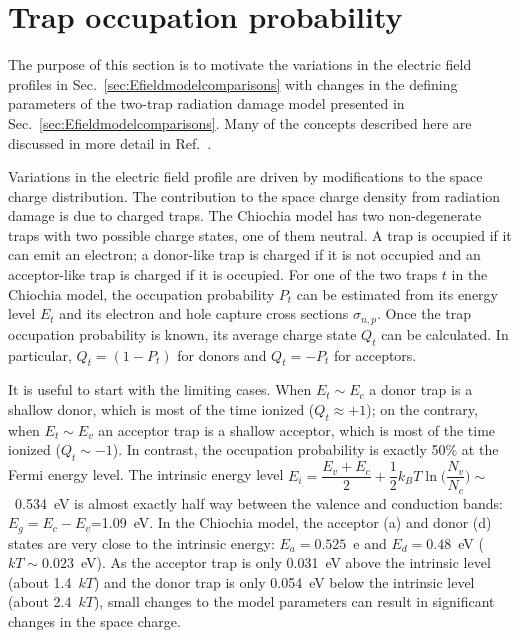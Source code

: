 \chapter{Trap occupation probability}
\label{sec:trapoccprob}

The purpose of this section is to motivate the variations in the electric field profiles in Sec.~\ref{sec:Efieldmodelcomparisons} with changes in the defining parameters of the two-trap radiation damage model presented in Sec.~\ref{sec:Efieldmodelcomparisons}.  Many of the concepts described here are discussed in more detail in Ref.~\cite{LUTZ1996}.

Variations in the electric field profile are driven by modifications to the space charge distribution.   The contribution to the space charge density from radiation damage is due to charged traps.  The Chiochia model has two non-degenerate traps with two possible charge states, one of them neutral.  A trap is occupied if it can emit an electron; a donor-like trap is charged if it is not occupied and an acceptor-like trap is charged if it is occupied.  For one of the two traps $t$ in the Chiochia model, the occupation probability $P_t$ can be estimated from its energy level $E_t$ and its electron and hole capture cross sections $\sigma_{n,p}$. Once the trap occupation probability is known, its average charge state $Q_t$  can be calculated.  In particular, $Q_t = (1-P_t)$ for donors and $Q_t=-P_t$ for acceptors.


It is useful to start with the limiting cases.  When $E_t\sim E_c$ a donor trap is a shallow donor, which is most of the time ionized ($Q_t\approx +1$); on the contrary, when $E_t\sim E_v$ an acceptor trap is a shallow acceptor, which is most of the time ionized ($Q_t\sim -1$).  In contrast, the occupation probability is exactly 50\% at the Fermi energy level.  The intrinsic energy level $E_i= \dfrac{E_v+E_c}{2}+\dfrac{1}{2}k_BT\ln\Big(\dfrac{N_v}{N_c}\Big)\sim$~0.534~eV is almost exactly half way between the valence and conduction bands: $E_g=E_c-E_v$=1.09~eV.  In the Chiochia model, the acceptor (a) and donor (d) states are very close to the intrinsic energy: $E_a=0.525$~e and  $E_d=0.48$~eV ($kT\sim 0.023$~eV).  As the acceptor trap is only 0.031~eV above the intrinsic level (about 1.4~$kT$) and the donor trap is only 0.054~eV below the  intrinsic level (about 2.4~$kT$), small changes to the model parameters can result in significant changes in the space charge.

